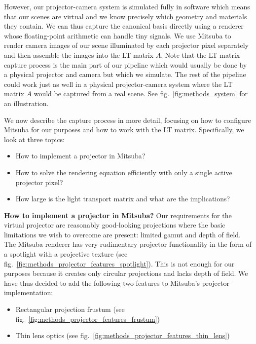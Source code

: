 However, our projector-camera system is simulated fully in software which means that our scenes are virtual and we know precisely which geometry and materials they contain. We can thus capture the canonical basis directly using a renderer whose floating-point arithmetic can handle tiny signals. We use Mitsuba to render camera images of our scene illuminated by each projector pixel separately and then assemble the images into the LT matrix \(A\). Note that the LT matrix capture process is the main part of our pipeline which would usually be done by a physical projector and camera but which we simulate. The rest of the pipeline could work just as well in a physical projector-camera system where the LT matrix \(A\) would be captured from a real scene. See fig.~\ref{fig:methods_system} for an illustration.

We now describe the capture process in more detail, focusing on how to configure Mitsuba for our purposes and how to work with the LT matrix. Specifically, we look at three topics:

\begin{itemize}
    \item How to implement a projector in Mitsuba?
    \item How to solve the rendering equation efficiently with only a single active projector pixel?
    \item How large is the light transport matrix and what are the implications?
\end{itemize}

\textbf{How to implement a projector in Mitsuba?} Our requirements for the virtual projector are reasonably good-looking projections where the basic limitations we wish to overcome are present: limited gamut and depth of field. The Mitsuba renderer has very rudimentary projector functionality in the form of a spotlight with a projective texture (see fig.~\ref{fig:methods_projector_features_spotlight}). This is not enough for our purposes because it creates only circular projections and lacks depth of field. We have thus decided to add the following two features to Mitsuba's projector implementation:

\begin{itemize}
    \item Rectangular projection frustum (see fig.~\ref{fig:methods_projector_features_frustum})
    \item Thin lens optics (see fig.~\ref{fig:methods_projector_features_thin_lens})
\end{itemize}

